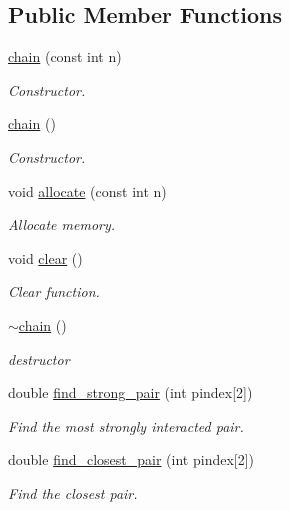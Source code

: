 \subsection*{Public Member Functions}
\begin{DoxyCompactItemize}
\item 
\hyperlink{classARC_1_1chain_a57b7cc99d82b1228aefc88d0c5feb509}{chain} (const int n)
\begin{DoxyCompactList}\small\item\em Constructor. \end{DoxyCompactList}\item 
\hyperlink{classARC_1_1chain_a8590b2bc343867d9ef246946f3002063}{chain} ()
\begin{DoxyCompactList}\small\item\em Constructor. \end{DoxyCompactList}\item 
void \hyperlink{classARC_1_1chain_a9ccc3dbc93660e08d78532b64500a0f5}{allocate} (const int n)
\begin{DoxyCompactList}\small\item\em Allocate memory. \end{DoxyCompactList}\item 
void \hyperlink{classARC_1_1chain_a4cf8d7e8253d71ce0110fb827add1b32}{clear} ()
\begin{DoxyCompactList}\small\item\em Clear function. \end{DoxyCompactList}\item 
\hyperlink{classARC_1_1chain_af83c26f178fd88947cdd53fa4b6cb047}{$\sim$chain} ()
\begin{DoxyCompactList}\small\item\em destructor \end{DoxyCompactList}\item 
double \hyperlink{classARC_1_1chain_a2ba334c62d603425faadda4019021dc4}{find\+\_\+strong\+\_\+pair} (int pindex\mbox{[}2\mbox{]})
\begin{DoxyCompactList}\small\item\em Find the most strongly interacted pair. \end{DoxyCompactList}\item 
double \hyperlink{classARC_1_1chain_ad5bbd543b79f0f2f3180d3a1b95914b9}{find\+\_\+closest\+\_\+pair} (int pindex\mbox{[}2\mbox{]})
\begin{DoxyCompactList}\small\item\em Find the closest pair. \end{DoxyCompactList}\item 

\end{DoxyCompactItemize}
